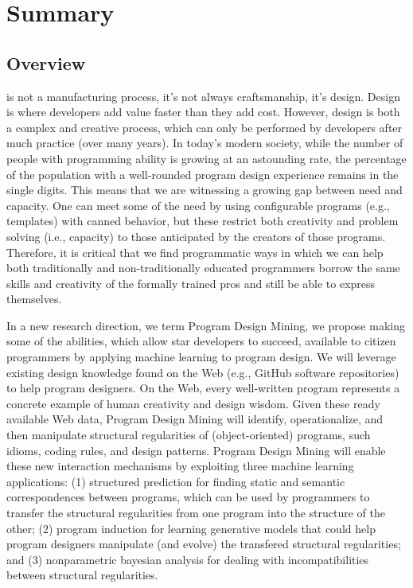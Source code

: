 \chapter{Summary}{}
\label{sec:intro}

\section*{Overview} %
\label{sec:overview}

 is not a manufacturing process, it's not 
always craftsmanship, it's design. Design is where developers add 
value faster than they add cost. However, design is both a complex 
and creative process, which can only be performed by developers after 
much practice (over many years). In today’s modern society, while the 
number of people with programming ability is growing at an astounding 
rate, the percentage of the population with a well-rounded program 
design experience remains in the single digits. This means that we are 
witnessing a growing gap between need and capacity. One can meet some of 
the need by using configurable programs (e.g., templates) with canned 
behavior, but these restrict both creativity and problem solving 
(i.e., capacity) to those anticipated by the creators of those programs. 
Therefore, it is critical that we find programmatic ways in which we can 
help both traditionally and non-traditionally educated programmers borrow 
the same skills and creativity of the formally trained pros and still 
be able to express themselves.

In a new research direction, we term Program Design Mining, we propose  
making some of the abilities, which allow star developers to succeed, 
available to citizen programmers by applying machine learning to program 
design. We will leverage existing design knowledge found on the Web (e.g., 
GitHub software repositories) to help program designers. On the Web, 
every well-written program represents a concrete example of human 
creativity and design wisdom. Given these ready available Web data, 
Program Design Mining will identify, operationalize, and then manipulate 
structural regularities \cite{minsky1991law} of (object-oriented) programs, 
such idioms, coding rules, and design patterns. Program Design Mining 
will enable these new interaction mechanisms by exploiting three 
machine learning applications: (1) structured prediction 
\cite{collins2002discriminative} for finding static and semantic correspondences 
between programs, which can be used by programmers to transfer the structural 
regularities from one program into the structure of the other; (2) program 
induction \cite{lake2015human} for learning generative models that could help 
program designers manipulate (and evolve) the transfered structural regularities; 
and (3) nonparametric bayesian analysis \cite{allamanis2014mining} for dealing 
with incompatibilities between structural regularities.

